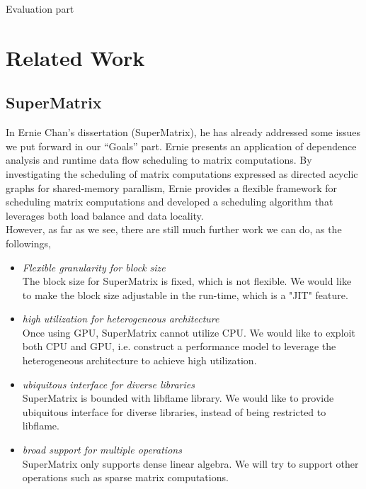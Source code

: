 \documentclass[preprint,11pt]{elsarticle}
\begin{document}
Evaluation part







\section{Related Work}


\subsection{SuperMatrix}
In Ernie Chan’s dissertation (SuperMatrix), he has already addressed some issues we put forward in our “Goals” part. Ernie presents an application of dependence analysis and runtime data flow scheduling to matrix computations. By investigating the scheduling of matrix computations expressed as directed acyclic graphs for shared-memory parallism, Ernie provides a flexible framework for scheduling matrix computations and developed a scheduling algorithm that leverages both load balance and data locality.\\
However, as far as we see, there are still much further work we can do, as the followings,
\begin{itemize}
	\item \emph{Flexible granularity for block size}\\
		The block size for SuperMatrix is fixed, which is not flexible. We would like to make the block size adjustable in the run-time, which is a "JIT" feature.
	\item \emph{high utilization for heterogeneous architecture}\\
		Once using GPU, SuperMatrix cannot utilize CPU. We would like to exploit both CPU and GPU, i.e. construct a performance model to leverage the heterogeneous architecture to achieve high utilization.
	\item \emph{ubiquitous interface for diverse libraries}\\
		SuperMatrix is bounded with libflame library. We would like to provide ubiquitous interface for diverse libraries, instead of being restricted to libflame.
	\item \emph{broad support for multiple operations}\\
		SuperMatrix only supports dense linear algebra. We will try to support other operations such as sparse matrix computations.
\
\end{itemize}
\end{document}
